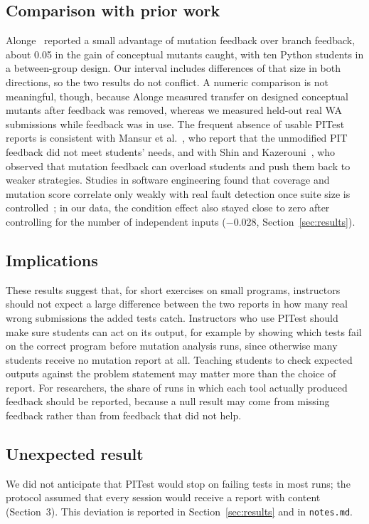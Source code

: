 \subsection{Comparison with prior work}
Alonge~\cite{alonge2025} reported a small advantage of mutation feedback over branch feedback, about 0.05 in the gain of conceptual mutants caught, with ten Python students in a between-group design.
Our interval includes differences of that size in both directions, so the two results do not conflict. A numeric comparison is not meaningful, though, because Alonge measured transfer on designed conceptual mutants after feedback was removed, whereas we measured held-out real WA submissions while feedback was in use.
The frequent absence of usable PITest reports is consistent with Mansur et al.~\cite{mansur2026}, who report that the unmodified PIT feedback did not meet students' needs, and with Shin and Kazerouni~\cite{shin2024}, who observed that mutation feedback can overload students and push them back to weaker strategies.
Studies in software engineering found that coverage and mutation score correlate only weakly with real fault detection once suite size is controlled~\cite{inozemtseva2014,papadakis2018}; in our data, the condition effect also stayed close to zero after controlling for the number of independent inputs ($-$0.028, Section~\ref{sec:results}).

\subsection{Implications}
These results suggest that, for short exercises on small programs, instructors should not expect a large difference between the two reports in how many real wrong submissions the added tests catch.
Instructors who use PITest should make sure students can act on its output, for example by showing which tests fail on the correct program before mutation analysis runs, since otherwise many students receive no mutation report at all.
Teaching students to check expected outputs against the problem statement may matter more than the choice of report.
For researchers, the share of runs in which each tool actually produced feedback should be reported, because a null result may come from missing feedback rather than from feedback that did not help.

\subsection{Unexpected result}
We did not anticipate that PITest would stop on failing tests in most runs; the protocol assumed that every session would receive a report with content (Section~3).
This deviation is reported in Section~\ref{sec:results} and in \texttt{notes.md}.

